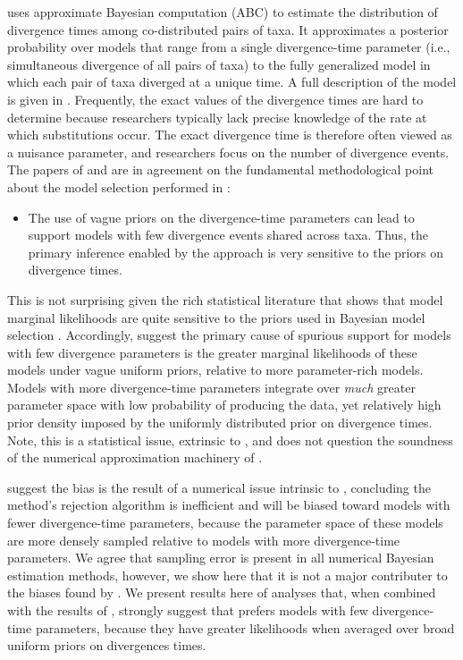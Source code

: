 \msb \citep{Huang2011} uses approximate Bayesian computation (ABC) to estimate
the distribution of divergence times among co-distributed pairs of taxa.
It approximates a posterior probability over models that range from a single
divergence-time parameter (i.e., simultaneous divergence of all pairs of taxa)
to the fully generalized model in which each pair of taxa diverged at a
unique time.
A full description of the model is given in \citet{Oaks2012}.
Frequently, the exact values of the divergence times are hard 
to determine because researchers typically lack precise knowledge 
of the rate at which substitutions occur.
The exact divergence time is therefore often viewed as a nuisance parameter,
and researchers focus on the number of divergence events.
The papers of \citet{Oaks2012} and \citet{Hickerson2013} are in agreement
on the fundamental methodological point about the model selection performed in \msb:
\begin{itemize}
   \item The use of vague priors on the divergence-time parameters can lead to
       support models with few divergence events shared across taxa. Thus, the
       primary inference enabled by the approach is very sensitive to the
       priors on divergence times.
\end{itemize}

This is not surprising given the rich statistical literature that shows that
model marginal likelihoods are quite sensitive to the priors used in Bayesian
model selection
\citep[e.g.,][]{Jeffreys1935,Lindley1957}.
Accordingly, \citet{Oaks2012} suggest the primary cause of spurious support
for models with few divergence parameters is the greater marginal likelihoods
of these models under vague uniform priors, relative to more parameter-rich
models.
Models with more divergence-time parameters integrate over \emph{much} greater
parameter space with low probability of producing the data, yet relatively high
prior density imposed by the uniformly distributed prior on divergence times.
Note, this is a statistical issue, extrinsic to \msb, and does not question the
soundness of the numerical approximation machinery of \msb.

\citet{Hickerson2013} suggest the bias is the result of a numerical issue
intrinsic to \msb, concluding the method's rejection algorithm is inefficient
and will be biased toward models with fewer divergence-time parameters, because
the parameter space of these models are more densely sampled relative to models
with more divergence-time parameters.
We agree that sampling error is present in all numerical Bayesian estimation
methods, however, we show here that it is not a major contributer to the
biases found by \citet{Oaks2012}.
We present results here of analyses that, when combined with the results
of \citet{Oaks2012}, strongly suggest that \msb prefers models with few
divergence-time parameters, because they have greater likelihoods when
averaged over broad uniform priors on divergences times.

